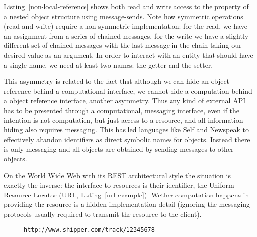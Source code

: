 \documentclass[preprint,authoryear]{acm_proc_article-sp}
\begin{document}
Listing~\ref{non-local-reference} shows both read and write access to the property
of a nested object structure using message-sends.  Note how symmetric operations
(read and write) require a non-symmetric implementation:  for the read, we have an assignment
from a series of chained messages, for the write we have a slightly different set of 
chained messages with the last message in the chain taking our desired value
as an argument.  In order to interact with an entity that should have a single name,
we need at least two names:  the getter and the setter.

This asymmetry is related to the fact that although we can hide an object reference 
behind a computational interface, we cannot
hide a computation behind a object reference interface, another asymmetry.
Thus any kind of external API has to be presented through a computational, messaging 
interface, even if the intention is not computation, but just access to a resource,
  and all information hiding also requires messaging.  This has led languages
like Self \cite{UngarS87} and Newspeak \cite{newspeak} to effectively abandon identifiers as direct symbolic names for objects. Instead there is only messaging and
all objects are obtained by sending messages to other objects.

On the World Wide Web with its REST architectural style the situation is exactly the inverse: 
the interface to resources is their identifier, the Uniform Resource Locator (URL, Listing~\ref{url-example}).   Wether
computation happens in providing the resource is a hidden implementation detail
(ignoring the messaging protocols usually required to transmit the resource
to the client).  


\begin{figure}[htbp]
\begin{lstlisting}[style=L,label=url-example,caption=A Uniform Resource Locator.]
http://www.shipper.com/track/12345678
\end{lstlisting}
\end{figure}
\end{document}
